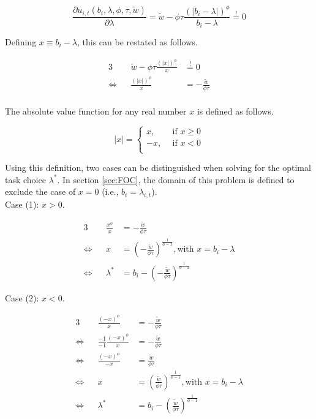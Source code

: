 \documentclass{article}
\begin{document}
\begin{appendix}
\begin{equation}
	\frac{\partial u_{i, t}(b_i, \lambda, \phi, \tau, \tilde{w})}{\partial \lambda} = \tilde{w} - \phi \tau \frac{(|b_i - \lambda|)^\phi}{b_i - \lambda} \overset{!}{=} 0
\end{equation}

Defining $x \equiv b_i - \lambda$, this can be restated as follows.

\begin{alignat*}{3}
	{}					&& \tilde{w} - \phi \tau \frac{(|x|)^\phi}{x} 	&\overset{!}{=} 0 \\
	\Leftrightarrow 	&& \frac{(|x|)^\phi}{x} 						&= - \frac{\tilde{w}}{\phi \tau} \label{eq:foc_restated} \\
\end{alignat*}

The absolute value function for any real number $x$ is defined as follows.

\begin{equation}
	|x| = \left\{
		\begin{array}{ll}
			x, \: & \: \text{if $x \geq 0$} \\
			-x, \: & \: \text{if $x < 0$} \\
		\end{array}
	\right.
\end{equation}

Using this definition, two cases can be distinguished when solving for the optimal task choice $\lambda^*$. In section \ref{sec:FOC}, the domain of this problem is defined to exclude the case of $x=0$ (i.e., $b_i = \lambda_{i,t}$).\\
Case (1): $x > 0$.

\begin{alignat*}{3}
	{}				&& \frac{x^\phi}{x} 	&= - \frac{\tilde{w}}{\phi \tau} \\
	\Leftrightarrow && x					&= (- \frac{\tilde{w}}{\phi \tau})^{\frac{1}{\phi-1}}, \text{with $x = b_i - \lambda$} \\
	\Leftrightarrow && \lambda^* 			&= b_i - (- \frac{\tilde{w}}{\phi \tau})^{\frac{1}{\phi-1}}
\end{alignat*}

Case (2): $x < 0$.

\begin{alignat*}{3}
	{}				&& \frac{(-x)^\phi}{x} 					&= - \frac{\tilde{w}}{\phi \tau} \\
	\Leftrightarrow && \frac{-1}{-1} \frac{(-x)^\phi}{x} 	&=  - \frac{\tilde{w}}{\phi \tau} \\
	\Leftrightarrow && \frac{(-x)^\phi}{-x} 				&= \frac{\tilde{w}}{\phi \tau} \\
	\Leftrightarrow && x 									&= (\frac{\tilde{w}}{\phi \tau})^\frac{1}{\phi-1}, \text{with $x = b_i - \lambda$} \\
	\Leftrightarrow && \lambda^*							&= b_i - (\frac{\tilde{w}}{\phi \tau})^\frac{1}{\phi-1} \\
\end{alignat*}


\end{appendix}
\end{document}
